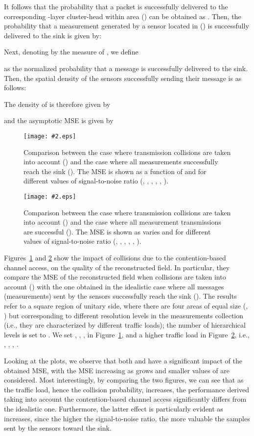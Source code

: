 \documentclass[11pt, draftcls, onecolumn, a4paper]{IEEEtran}
\newcommand{\insertfig}[4]{
\begin{figure}[ht]
\centerline{\texttt{[image: \#2.eps]}}
\caption{#3}\label{#4}\end{figure}}
\begin{document}
It follows that the probability that a packet 
is successfully delivered to the corresponding -layer cluster-head 
within area  () can be obtained as 
.
Then, the probability that a measurement generated
by a sensor located in  () is successfully 
delivered to the sink is given by: 


Next, denoting by  the measure of , we define 

as the normalized probability that a message is successfully
delivered to the sink. Then, the spatial density of the sensors successfully
sending their message is as follows:

The density of  is therefore given by

and the asymptotic MSE is given by



\insertfig{0.8}{lambda2}{Comparison between the case where transmission
collisions are taken into account () and the case where all measurements successfully
reach the sink (). The MSE is shown as a function of  and for different values of signal-to-noise ratio (, , 
, , , ).}{fig:lambda2}

\insertfig{0.8}{lambda1}{Comparison between the case where transmission
collisions are taken into account () and the case where all measurement transmissions are successful (). The MSE is shown as  varies and for different values of signal-to-noise ratio (, , 
, , , ).}{fig:lambda1}

Figures~\ref{fig:lambda2} and \ref{fig:lambda1} show the impact of 
collisions due to the contention-based channel access, on the
quality of the reconstructed field. In particular, they compare the MSE of the
reconstructed field when collisions are taken into account () with
the one obtained in the idealistic case where all messages (measurements) 
sent by the sensors successfully reach the sink ().
The results refer to a square region of unitary side, where there are four
areas of equal size (, ) but corresponding 
to different resolution levels in the measurements collection (i.e.,
they are characterized by different traffic loads);
the number of hierarchical levels is set to .
We set , , ,  in Figure~\ref{fig:lambda2}, and
a higher traffic load in Figure~\ref{fig:lambda1}, i.e., , , , . 

Looking at the plots, we observe that both  and  have a significant impact of the obtained MSE, with the MSE increasing as  grows and smaller values of  are considered. 
Most interestingly, by comparing the two figures,
we can see that as the traffic load, hence the collision probability, increases, the performance derived taking into account the contention-based channel access significantly differs from
the idealistic one. Furthermore, the latter effect is particularly evident as
 increases, since the higher the signal-to-noise ratio, the more
valuable the samples sent by the sensors toward the sink.
\end{document}
